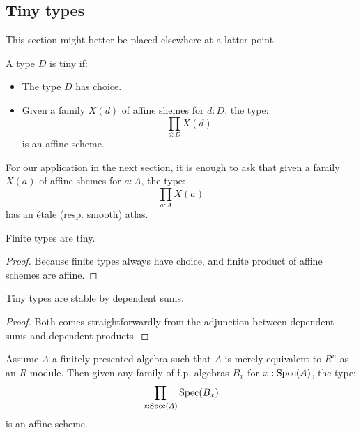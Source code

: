 \subsection{Tiny types}

This section might better be placed elsewhere at a latter point.

\begin{definition}
A type $D$ is tiny if:
\begin{itemize}
\item The type $D$ has choice.
\item Given a family $X(d)$ of affine shemes for $d:D$, the type:
\[\prod_{d:D}X(d)\] 
is an affine scheme.
\end{itemize}
\end{definition}

\begin{remark}
For our application in the next section, it is enough to ask that given a family $X(a)$ of affine shemes for $a:A$, the type:
\[\prod_{a:A}X(a)\] 
has an étale (resp. smooth) atlas.
\end{remark}

\begin{lemma}
Finite types are tiny.
\end{lemma}

\begin{proof}
Because finite types always have choice, and finite product of affine schemes are affine.
\end{proof}

\begin{lemma}\label{tiny-sums}
Tiny types are stable by dependent sums.
\end{lemma}

\begin{proof}
Both comes straightforwardly from the adjunction between dependent sums and dependent products.
\end{proof}

\begin{lemma}\label{product-finite-preserve-scheme}
Assume $A$ a finitely presented algebra such that $A$ is merely equivalent to $R^n$ as an $R$-module. Then given any family of f.p. algebras $B_x$ for $x:\operatorname{Spec}(A)$, the type:
\[\prod_{x:\operatorname{Spec}(A)}\operatorname{Spec}(B_x)\]
is an affine scheme.
\end{lemma}

